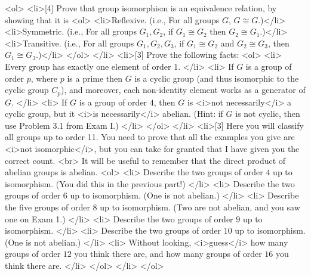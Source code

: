 <ol>
  <li>[4]
    Prove that group isomorphism is an equivalence relation, by showing that it is <ol>
      <li>Reflexive. (i.e., For all groups \(G\), \(G \cong G\).)</li>
      <li>Symmetric. (i.e., For all groups \(G_1, G_2\), if \(G_1 \cong G_2\) then \(G_2 \cong G_1\).)</li>
      <li>Transitive. (i.e., For all groups \(G_1, G_2, G_3\), if \(G_1 \cong G_2\) and \(G_2 \cong G_3\), then \(G_1 \cong G_3\).)</li>
    </ol>
  </li>
  <li>[3]
    Prove the following facts:
    <ol>
      <li>
        Every group has exactly one element of order \(1\).
      </li>
      <li>
        If \(G\) is a group of order \(p\), where \(p\) is a prime then \(G\) is a cyclic group (and thus isomorphic to the cyclic group \(C_p\)), and moreover, each non-identity element works as a generator of \(G\).
      </li>
      <li>
        If \(G\) is a group of order \(4\), then \(G\) is <i>not necessarily</i> a cyclic group, but it <i>is necessarily</i> abelian. (Hint: if \(G\) is not cyclic, then use Problem 3.1 from Exam I.)
      </li>
    </ol>
  </li>
  <li>[3]
    Here you will classify all groups up to order 11. You need to prove that all the examples you give are <i>not isomorphic</i>, but you can take for granted that I have given you the correct count.
    <br>
    It will be useful to remember that the direct product of abelian groups is abelian.
    <ol>
      <li>
        Describe the two groups of order \(4\) up to isomorphism. (You did this in the previous part!)
      </li>
      <li>
        Describe the two groups of order \(6\) up to isomorphism. (One is not abelian.)
      </li>
      <li>
        Describe the five groups of order \(8\) up to isomorphism. (Two are not abelian, and you saw one on Exam 1.)
      </li>
      <li>
        Describe the two groups of order \(9\) up to isomorphism.
      </li>
      <li>
        Describe the two groups of order \(10\) up to isomorphism. (One is not abelian.)
      </li>
      <li>
        Without looking, <i>guess</i> how many groups of order \(12\) you think there are, and how many groups of order \(16\) you think there are.
      </li>
    </ol>
  </li>
</ol>
